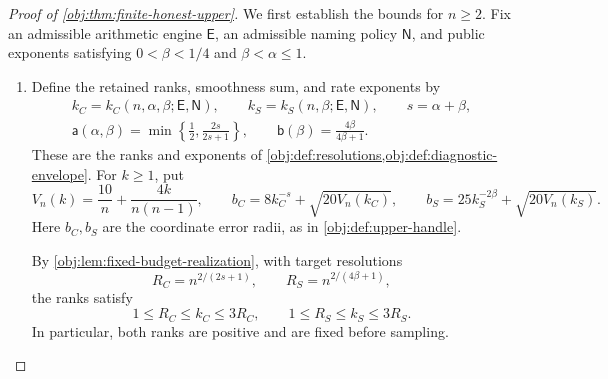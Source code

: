 \documentclass[11pt]{article}
\begin{document}
\begin{proof}[Proof of \cref{obj:thm:finite-honest-upper}]
We first establish the bounds for \(n\ge2\). Fix an admissible arithmetic engine \(\mathsf E\), an admissible naming policy \(\mathsf N\), and public exponents satisfying \(0<\beta<1/4\) and \(\beta<\alpha\le1\).

\begin{enumerate}
\item Define the retained ranks, smoothness sum, and rate exponents by
\[
\begin{gathered}
k_C=k_C(n,\alpha,\beta;\mathsf E,\mathsf N),
\qquad
k_S=k_S(n,\beta;\mathsf E,\mathsf N),
\qquad s=\alpha+\beta,\\
\mathsf a(\alpha,\beta)
=\min\left\{\frac12,\frac{2s}{2s+1}\right\},
\qquad
\mathsf b(\beta)=\frac{4\beta}{4\beta+1}.
\end{gathered}
\]
These are the ranks and exponents of
\cref{obj:def:resolutions,obj:def:diagnostic-envelope}.
For \(k\ge1\), put
\[
V_n(k)=\frac{10}{n}+\frac{4k}{n(n-1)},
\qquad
b_C=8k_C^{-s}+\sqrt{20V_n(k_C)},
\qquad
b_S=25k_S^{-2\beta}+\sqrt{20V_n(k_S)}.
\]
Here \(b_C,b_S\) are the coordinate error radii, as in
\cref{obj:def:upper-handle}.

By \cref{obj:lem:fixed-budget-realization}, with target resolutions
\[
R_C=n^{2/(2s+1)},
\qquad R_S=n^{2/(4\beta+1)},
\]
the ranks satisfy
\[
1\le R_C\le k_C\le3R_C,
\qquad
1\le R_S\le k_S\le3R_S.
\]
In particular, both ranks are positive and are fixed before sampling.


\end{enumerate}
\end{proof}
\end{document}
